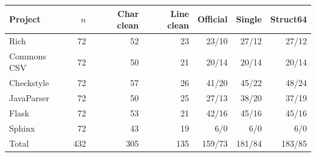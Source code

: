 \begin{tabular}{lrrrrrr}
\toprule
Project & $n$ & Char clean & Line clean & Official & Single & Struct64 \\
\midrule
Rich & 72 & 52 & 23 & 23/10 & 27/12 & 27/12 \\
Commons CSV & 72 & 50 & 21 & 20/14 & 20/14 & 20/14 \\
Checkstyle & 72 & 57 & 26 & 41/20 & 45/22 & 48/24 \\
JavaParser & 72 & 50 & 25 & 27/13 & 38/20 & 37/19 \\
Flask & 72 & 53 & 21 & 42/16 & 45/16 & 45/16 \\
Sphinx & 72 & 43 & 19 & 6/0 & 6/0 & 6/0 \\
Total & 432 & 305 & 135 & 159/73 & 181/84 & 183/85 \\
\bottomrule
\end{tabular}
